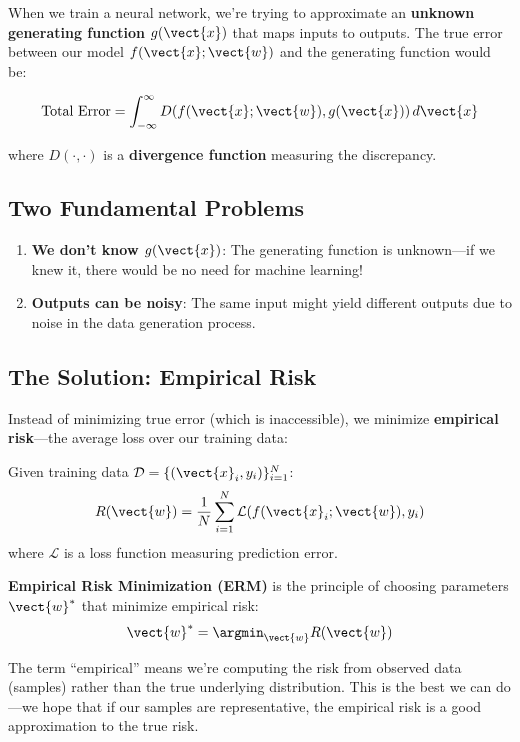 When we train a neural network, we're trying to approximate an \textbf{unknown generating function} $g(\vect{x})$ that maps inputs to outputs. The true error between our model $f(\vect{x}; \vect{w})$ and the generating function would be:

\[
\text{Total Error} = \int_{-\infty}^{\infty} D(f(\vect{x}; \vect{w}), g(\vect{x})) \, d\vect{x}
\]

where $D(\cdot, \cdot)$ is a \textbf{divergence function} measuring the discrepancy.

\subsection{Two Fundamental Problems}

\begin{enumerate}
    \item \textbf{We don't know $g(\vect{x})$}: The generating function is unknown---if we knew it, there would be no need for machine learning!
    
    \item \textbf{Outputs can be noisy}: The same input might yield different outputs due to noise in the data generation process.
\end{enumerate}

\subsection{The Solution: Empirical Risk}

Instead of minimizing true error (which is inaccessible), we minimize \textbf{empirical risk}---the average loss over our training data:

\begin{definitionbox}
Given training data $\mathcal{D} = \{(\vect{x}_i, y_i)\}_{i=1}^{N}$:
\[
R(\vect{w}) = \frac{1}{N} \sum_{i=1}^{N} \mathcal{L}(f(\vect{x}_i; \vect{w}), y_i)
\]
where $\mathcal{L}$ is a loss function measuring prediction error.
\end{definitionbox}

\textbf{Empirical Risk Minimization (ERM)} is the principle of choosing parameters $\vect{w}^*$ that minimize empirical risk:
\[
\vect{w}^* = \argmin_{\vect{w}} R(\vect{w})
\]

\begin{bluebox}
The term ``empirical'' means we're computing the risk from observed data (samples) rather than the true underlying distribution. This is the best we can do---we hope that if our samples are representative, the empirical risk is a good approximation to the true risk.
\end{bluebox}

